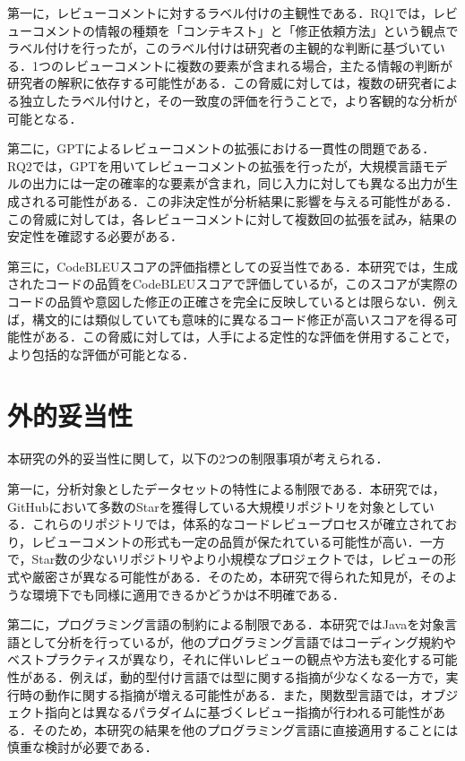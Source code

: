\documentclass[11pt]{jreport}
\begin{document}
第一に，レビューコメントに対するラベル付けの主観性である．RQ1では，レビューコメントの情報の種類を「コンテキスト」と「修正依頼方法」という観点でラベル付けを行ったが，このラベル付けは研究者の主観的な判断に基づいている．1つのレビューコメントに複数の要素が含まれる場合，主たる情報の判断が研究者の解釈に依存する可能性がある．この脅威に対しては，複数の研究者による独立したラベル付けと，その一致度の評価を行うことで，より客観的な分析が可能となる．

第二に，GPTによるレビューコメントの拡張における一貫性の問題である．RQ2では，GPTを用いてレビューコメントの拡張を行ったが，大規模言語モデルの出力には一定の確率的な要素が含まれ，同じ入力に対しても異なる出力が生成される可能性がある．この非決定性が分析結果に影響を与える可能性がある．この脅威に対しては，各レビューコメントに対して複数回の拡張を試み，結果の安定性を確認する必要がある．

第三に，CodeBLEUスコアの評価指標としての妥当性である．本研究では，生成されたコードの品質をCodeBLEUスコアで評価しているが，このスコアが実際のコードの品質や意図した修正の正確さを完全に反映しているとは限らない．例えば，構文的には類似していても意味的に異なるコード修正が高いスコアを得る可能性がある．この脅威に対しては，人手による定性的な評価を併用することで，より包括的な評価が可能となる．

\section {外的妥当性}
本研究の外的妥当性に関して，以下の2つの制限事項が考えられる．

第一に，分析対象としたデータセットの特性による制限である．本研究では，GitHubにおいて多数のStarを獲得している大規模リポジトリを対象としている．これらのリポジトリでは，体系的なコードレビュープロセスが確立されており，レビューコメントの形式も一定の品質が保たれている可能性が高い．一方で，Star数の少ないリポジトリやより小規模なプロジェクトでは，レビューの形式や厳密さが異なる可能性がある．そのため，本研究で得られた知見が，そのような環境下でも同様に適用できるかどうかは不明確である．

第二に，プログラミング言語の制約による制限である．本研究ではJavaを対象言語として分析を行っているが，他のプログラミング言語ではコーディング規約やベストプラクティスが異なり，それに伴いレビューの観点や方法も変化する可能性がある\cite{Berger2019On}．例えば，動的型付け言語では型に関する指摘が少なくなる一方で，実行時の動作に関する指摘が増える可能性がある．また，関数型言語では，オブジェクト指向とは異なるパラダイムに基づくレビュー指摘が行われる可能性がある．そのため，本研究の結果を他のプログラミング言語に直接適用することには慎重な検討が必要である．
\end{document}

